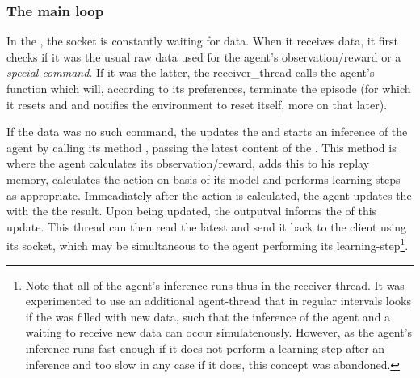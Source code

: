\subsubsection{The main loop}

In the , the socket is constantly waiting for data. When it receives data, it first checks if it was the usual raw data used for the agent's observation/reward or a \textit{special command}. If it was the latter, the receiver\_thread calls the agent's function  which will, according to its preferences, terminate the episode (for which it resets  and  and notifies the environment to reset itself, more on that later). 

If the data was no such command, the  updates the  and starts an inference of the agent by calling its method , passing the latest content of the . This method is where the agent calculates its observation/reward, adds this to his replay memory, calculates the action on basis of its model and performs learning steps as appropriate. Immeadiately after the action is calculated, the agent updates the  with the the result. Upon being updated, the outputval informs the  of this update. This thread can then read the latest  and send it back to the client using its socket, which may be simultaneous to the agent performing its learning-step\footnote{Note that all of the agent's inference runs thus in the receiver-thread. It was experimented to use an additional agent-thread that in regular intervals looks if the  was filled with new data, such that the inference of the agent and a waiting to receive new data can occur simulatenously. However, as the agent's inference runs fast enough if it does not perform a learning-step after an inference and too slow in any case if it does, this concept was abandoned.}. 

